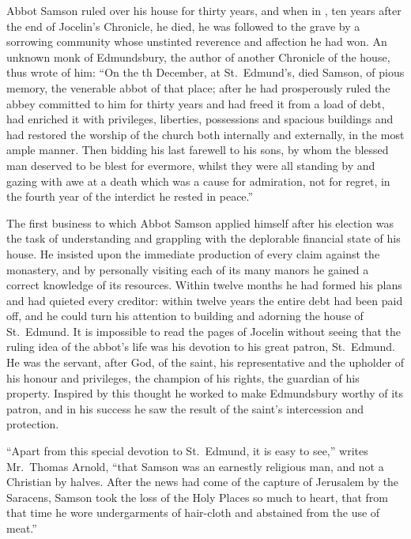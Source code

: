 \documentclass[10pt]{book}
\begin{document}
{{{Abbot Samson ruled over his house for thirty years, and when in , ten years after the end of Jocelin's Chronicle, he died, he was followed to the grave by a sorrowing community whose unstinted reverence and affection he had won. An unknown monk of Edmundsbury, the author of another Chronicle of the house, thus wrote of him: ``On the th December, at St.\ Edmund's, died Samson, of pious memory, the venerable abbot of that place; after he had prosperously ruled the abbey committed to him for thirty years and had freed it from a load of debt, had enriched it with privileges, liberties, possessions and spacious buildings and had restored the worship of the church both internally and externally, in the most ample manner. Then bidding his last farewell to his sons, by whom the blessed man deserved to be blest for evermore, whilst they were all standing by and gazing with awe at a death which was a cause for admiration, not for regret, in the fourth year of the interdict he rested in peace.''

The first business to which Abbot Samson applied himself after his election was the task of understanding and grappling with the deplorable financial state of his house. He insisted upon the immediate production of every claim against the monastery, and by personally visiting each of its many manors he gained a correct knowledge of its resources. Within twelve months he had formed his plans and had quieted every creditor: within twelve years the entire debt had been paid off, and he could turn his attention to building and adorning the house of St.\ Edmund. It is impossible to read the pages of Jocelin without seeing that the ruling idea of the abbot's life was his devotion to his great patron, St.\ Edmund. He was the servant, after God, of the saint, his representative and the upholder of his honour and privileges, the champion of his rights, the guardian of his property. Inspired by this thought he worked to make Edmundsbury worthy of its patron, and in his success he saw the result of the saint's intercession and protection.

``Apart from this special devotion to St.\ Edmund, it is easy to see,'' writes Mr.\ Thomas Arnold, ``that Samson was an earnestly religious man, and not a Christian by halves. After the news had come of the capture of Jerusalem by the Saracens, Samson took the loss of the Holy Places so much to heart, that from that time he wore undergarments of hair-cloth and abstained from the use of meat.''

}}}
\end{document}
